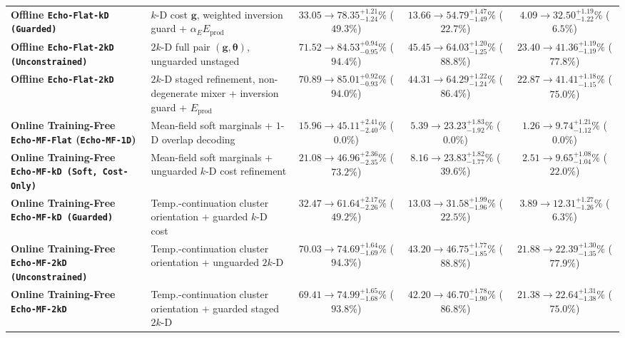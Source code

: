 \documentclass[10pt,a4paper]{article}
\begin{document}
\begin{table}[!htbp]
{\begin{tabular}{llccc}
\textbf{Offline \texttt{Echo-Flat-kD (Guarded)}} & $k$-D cost $\boldsymbol{g}$, weighted inversion guard + $\alpha_E E_{\mathrm{prod}}$ & $33.05 \rightarrow 78.35^{+1.21}_{-1.24}\%$ ($49.3\%$) & $13.66 \rightarrow 54.79^{+1.47}_{-1.49}\%$ ($22.7\%$) & $4.09 \rightarrow 32.50^{+1.19}_{-1.22}\%$ ($6.5\%$) \\
\textbf{Offline \texttt{Echo-Flat-2kD (Unconstrained)}} & $2k$-D full pair $(\boldsymbol{g},\boldsymbol{\theta})$, unguarded unstaged & $71.52 \rightarrow 84.53^{+0.94}_{-0.95}\%$ ($94.4\%$) & $45.45 \rightarrow 64.03^{+1.20}_{-1.25}\%$ ($88.8\%$) & $23.40 \rightarrow 41.36^{+1.19}_{-1.19}\%$ ($77.8\%$) \\
\textbf{Offline \texttt{Echo-Flat-2kD}} & $2k$-D staged refinement, non-degenerate mixer + inversion guard + $E_{\mathrm{prod}}$ & $70.89 \rightarrow \mathbf{85.01}^{+0.92}_{-0.93}\%$ ($94.0\%$) & $44.31 \rightarrow \mathbf{64.29}^{+1.22}_{-1.24}\%$ ($86.4\%$) & $22.87 \rightarrow \mathbf{41.41}^{+1.18}_{-1.15}\%$ ($75.0\%$) \\
\textbf{Online Training-Free \texttt{Echo-MF-Flat} (\texttt{Echo-MF-1D})} & Mean-field soft marginals + $1$-D overlap decoding & $15.96 \rightarrow 45.11^{+2.41}_{-2.40}\%$ ($0.0\%$) & $5.39 \rightarrow 23.23^{+1.83}_{-1.92}\%$ ($0.0\%$) & $1.26 \rightarrow 9.74^{+1.21}_{-1.12}\%$ ($0.0\%$) \\
\textbf{Online Training-Free \texttt{Echo-MF-kD (Soft,\allowbreak\ Cost-Only)}} & Mean-field soft marginals + unguarded $k$-D cost refinement & $21.08 \rightarrow 46.96^{+2.36}_{-2.35}\%$ ($73.2\%$) & $8.16 \rightarrow 23.83^{+1.82}_{-1.77}\%$ ($39.6\%$) & $2.51 \rightarrow 9.65^{+1.08}_{-1.04}\%$ ($22.0\%$) \\
\textbf{Online Training-Free \texttt{Echo-MF-kD (Guarded)}} & Temp.-continuation cluster orientation + guarded $k$-D cost & $32.47 \rightarrow 61.64^{+2.17}_{-2.26}\%$ ($49.2\%$) & $13.03 \rightarrow 31.58^{+1.99}_{-1.96}\%$ ($22.5\%$) & $3.89 \rightarrow 12.31^{+1.27}_{-1.26}\%$ ($6.3\%$) \\
\textbf{Online Training-Free \texttt{Echo-MF-2kD (Unconstrained)}} & Temp.-continuation cluster orientation + unguarded $2k$-D & $70.03 \rightarrow 74.69^{+1.64}_{-1.69}\%$ ($94.3\%$) & $43.20 \rightarrow \mathbf{46.75}^{+1.77}_{-1.85}\%$ ($88.8\%$) & $21.88 \rightarrow 22.39^{+1.30}_{-1.35}\%$ ($77.9\%$) \\
\textbf{Online Training-Free \texttt{Echo-MF-2kD}} & Temp.-continuation cluster orientation + guarded staged $2k$-D & $69.41 \rightarrow \mathbf{74.99}^{+1.65}_{-1.68}\%$ ($93.8\%$) & $42.20 \rightarrow 46.70^{+1.78}_{-1.90}\%$ ($86.8\%$) & $21.38 \rightarrow \mathbf{22.64}^{+1.31}_{-1.38}\%$ ($75.0\%$) \\
\bottomrule
\end{tabular}%
}
\end{table}
\end{document}
